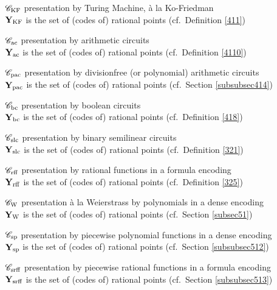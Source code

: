 \begin{itemize}\itemsep.5pt

\item [${{{\mathscr C}}_{\rm KF}}$] 
presentation by Turing Machine, à la Ko-Friedman\\
${{\bf Y}_{\rm KF}}$ is the set of (codes of) rational points  (cf.\ Definition \ref{411})

\item [${{{\mathscr C}}_{\rm ac}}$] 
presentation by arithmetic circuits\\
${{\bf Y}_{\rm ac}}$ is the set of (codes of) rational points (cf.\ Definition \ref{4110})

\item [${{{\mathscr C}}_{\rm pac}}$] 
presentation by divisionfree (or polynomial) arithmetic circuits\\
${{\bf Y}_{\rm pac}}$ is the set of (codes of) rational points (cf.\ Section \ref{subsubsec414})

\item [${{{\mathscr C}}_{\rm bc}}$] 
presentation by boolean circuits\\
${{\bf Y}_{\rm bc}}$ is the set of (codes of) rational points (cf.\ Definition \ref{418})

\item [${{{\mathscr C}}_{\rm slc}}$] 
presentation by binary semilinear circuits\\
${{\bf Y}_{\rm slc}}$ is the set of (codes of) rational points (cf.\ Definition \ref{321})

\item [${{{\mathscr C}}_{\rm rff}}$] 
presentation by rational functions in a formula encoding\\
${{\bf Y}_{\rm rff}}$ is the set of (codes of) rational points (cf.\ Definition \ref{325})

\item [${{{\mathscr C}}_{\rm W}}$] 
presentation à la Weierstrass by polynomials in a dense encoding\\
${{\bf Y}_{\rm W}}$ is the set of (codes of) rational points (cf.\ Section \ref{subsec51})

\item [${{{\mathscr C}}_{\rm sp}}$] 
presentation by piecewise polynomial functions in a dense encoding\\
${{\bf Y}_{\rm sp}}$ is the set of (codes of) rational points (cf.\ Section \ref{subsubsec512})

\item [${{{\mathscr C}}_{\rm srff}}$] 
presentation by piecewise rational functions in a formula encoding\\
${{\bf Y}_{\rm srff}}$ is the set of (codes of) rational points (cf.\ Section \ref{subsubsec513})
\end{itemize}

